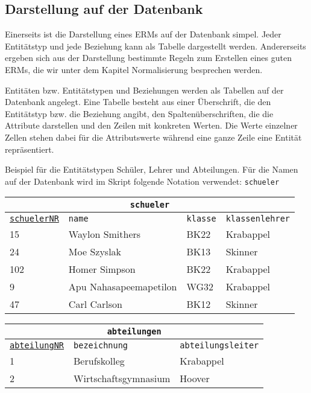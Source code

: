 \subsection[Darstellung auf der DB]{Darstellung auf der Datenbank}
Einerseits ist die Darstellung eines ERMs auf der Datenbank simpel. Jeder Entitätstyp und jede Beziehung kann als Tabelle dargestellt werden. Andererseits ergeben sich aus der Darstellung bestimmte Regeln zum Erstellen eines guten ERMs, die wir unter dem Kapitel Normalisierung besprechen werden.

\begin{tcolorbox}[title=Entitäten/-stypen und Beziehungen auf der Datenbank]
	Entitäten bzw. Entitätstypen und Beziehungen werden als Tabellen auf der Datenbank angelegt. Eine Tabelle besteht aus einer Überschrift, die den Entitätstyp bzw. die Beziehung angibt, den Spaltenüberschriften, die die Attribute darstellen und den Zeilen mit konkreten Werten. Die Werte einzelner Zellen stehen dabei für die Attributswerte während eine ganze Zeile eine Entität repräsentiert.
\end{tcolorbox}
Beispiel für die Entitätstypen Schüler, Lehrer und Abteilungen. Für die Namen auf der Datenbank wird im Skript folgende Notation verwendet: \lstinline!schueler!

\medskip

\begin{tabular}{llll}
	\multicolumn{4}{c}{\lstinline!schueler!}\\
	\hline
	\underline{\lstinline!schuelerNR!}&\lstinline!name!&\lstinline!klasse!&\lstinline!klassenlehrer!\\
	\hline
	15&Waylon Smithers&BK22&Krabappel\\
	24&Moe Szyslak&BK13&Skinner\\
	102&Homer Simpson&BK22&Krabappel\\
	9&Apu Nahasapeemapetilon&WG32&Krabappel\\
	47&Carl Carlson&BK12&Skinner\\
\end{tabular}

\begin{tabular}{lll}
	\multicolumn{3}{c}{\lstinline!abteilungen!}\\
	\hline
	\underline{\lstinline!abteilungNR!}&\lstinline!bezeichnung!&\lstinline!abteilungsleiter!\\
	\hline
	1&Berufskolleg&Krabappel\\
	2&Wirtschaftsgymnasium&Hoover\\
\end{tabular}

